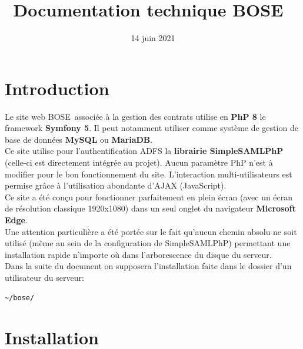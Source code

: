 \documentclass[10pt,a4paper]{article}
\newcommand{\projectName}{BOSE\ }
\begin{document}
	\title{\Huge{\textbf{Documentation technique \projectName}}}
	\date{\vspace{-5ex}14 juin 2021}
	\maketitle

	\setlength{\parindent}{0cm}
	
	\tableofcontents
	
	\newpage
	
	\section{Introduction}
	
	Le site web \projectName associée à la gestion des contrats utilise en \textbf{PhP 8} le framework \textbf{Symfony 5}. Il peut notamment utiliser comme système de gestion de base de données \textbf{MySQL} ou \textbf{MariaDB}.\\
	Ce site utilise pour l'authentification ADFS la \textbf{librairie SimpleSAMLPhP} (celle-ci est directement intégrée au projet). Aucun paramètre PhP n'est à modifier pour le bon fonctionnement du site. L'interaction multi-utilisateurs est permise grâce à l'utilisation abondante d'AJAX (JavaScript).\\
	Ce site a été conçu pour fonctionner parfaitement en plein écran (avec un écran de résolution classique 1920x1080) dans un seul onglet du navigateur \textbf{Microsoft Edge}.\\ %
	Une attention particulière a été portée sur le fait qu'aucun chemin absolu ne soit utilisé (même au sein de la configuration de SimpleSAMLPhP) permettant une installation rapide n'importe où dans l'arborescence du disque du serveur.\\
	Dans la suite du document on supposera l'installation faite dans le dossier d'un utilisateur du serveur:
	\begin{lstlisting}[language=bash]
	~/bose/
	\end{lstlisting}
	
	\section{Installation}
	
\end{document}
